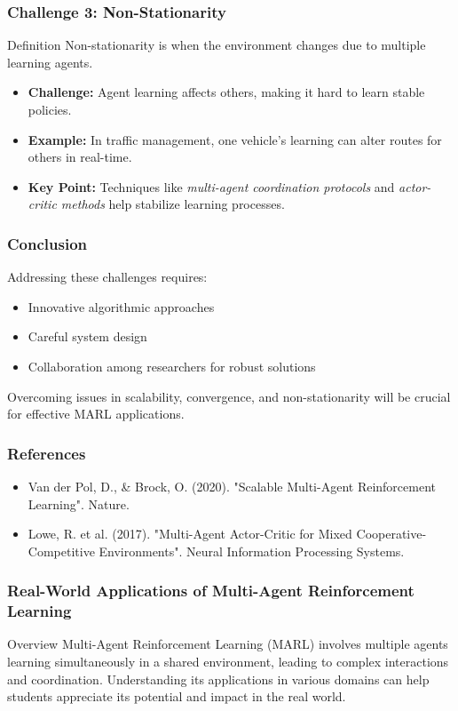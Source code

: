 \documentclass[aspectratio=169]{beamer}
\begin{document}
\begin{frame}[fragile]
    \frametitle{Challenge 3: Non-Stationarity}
    \begin{block}{Definition}
        Non-stationarity is when the environment changes due to multiple learning agents.
    \end{block}
    \begin{itemize}
        \item \textbf{Challenge:} Agent learning affects others, making it hard to learn stable policies.
        \item \textbf{Example:} In traffic management, one vehicle's learning can alter routes for others in real-time.
        \item \textbf{Key Point:} Techniques like \textit{multi-agent coordination protocols} and \textit{actor-critic methods} help stabilize learning processes.
    \end{itemize}
\end{frame}

\begin{frame}[fragile]
    \frametitle{Conclusion}
    Addressing these challenges requires:
    \begin{itemize}
        \item Innovative algorithmic approaches
        \item Careful system design
        \item Collaboration among researchers for robust solutions
    \end{itemize}
    Overcoming issues in scalability, convergence, and non-stationarity will be crucial for effective MARL applications.
\end{frame}

\begin{frame}[fragile]
    \frametitle{References}
    \begin{itemize}
        \item Van der Pol, D., \& Brock, O. (2020). "Scalable Multi-Agent Reinforcement Learning". Nature.
        \item Lowe, R. et al. (2017). "Multi-Agent Actor-Critic for Mixed Cooperative-Competitive Environments". Neural Information Processing Systems.
    \end{itemize}
\end{frame}

\begin{frame}[fragile]
    \frametitle{Real-World Applications of Multi-Agent Reinforcement Learning}
    \begin{block}{Overview}
        Multi-Agent Reinforcement Learning (MARL) involves multiple agents learning simultaneously in a shared environment, leading to complex interactions and coordination.
        Understanding its applications in various domains can help students appreciate its potential and impact in the real world.
    \end{block}
\end{frame}
\end{document}
